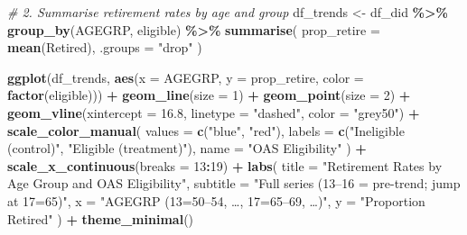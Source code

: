 \documentclass[
]{article}
\newenvironment{Shaded}{\begin{snugshade}}{\end{snugshade}}
\newcommand{\AttributeTok}[1]{\textcolor[rgb]{0.13,0.29,0.53}{#1}}
\newcommand{\CommentTok}[1]{\textcolor[rgb]{0.56,0.35,0.01}{\textit{#1}}}
\newcommand{\DecValTok}[1]{\textcolor[rgb]{0.00,0.00,0.81}{#1}}
\newcommand{\FloatTok}[1]{\textcolor[rgb]{0.00,0.00,0.81}{#1}}
\newcommand{\FunctionTok}[1]{\textcolor[rgb]{0.13,0.29,0.53}{\textbf{#1}}}
\newcommand{\NormalTok}[1]{#1}
\newcommand{\OtherTok}[1]{\textcolor[rgb]{0.56,0.35,0.01}{#1}}
\newcommand{\SpecialCharTok}[1]{\textcolor[rgb]{0.81,0.36,0.00}{\textbf{#1}}}
\newcommand{\StringTok}[1]{\textcolor[rgb]{0.31,0.60,0.02}{#1}}
\begin{document}
\begin{Shaded}
\begin{Highlighting}[]
\CommentTok{\# 2. Summarise retirement rates by age and group}
\NormalTok{df\_trends }\OtherTok{\textless{}{-}}\NormalTok{ df\_did }\SpecialCharTok{\%\textgreater{}\%}
  \FunctionTok{group\_by}\NormalTok{(AGEGRP, eligible) }\SpecialCharTok{\%\textgreater{}\%}
  \FunctionTok{summarise}\NormalTok{(}
    \AttributeTok{prop\_retire =} \FunctionTok{mean}\NormalTok{(Retired),}
    \AttributeTok{.groups =} \StringTok{"drop"}
\NormalTok{  )}
\end{Highlighting}
\end{Shaded}

\begin{Shaded}
\begin{Highlighting}[]
\FunctionTok{ggplot}\NormalTok{(df\_trends, }\FunctionTok{aes}\NormalTok{(}\AttributeTok{x =}\NormalTok{ AGEGRP, }\AttributeTok{y =}\NormalTok{ prop\_retire, }\AttributeTok{color =} \FunctionTok{factor}\NormalTok{(eligible))) }\SpecialCharTok{+}
  \FunctionTok{geom\_line}\NormalTok{(}\AttributeTok{size =} \DecValTok{1}\NormalTok{) }\SpecialCharTok{+}
  \FunctionTok{geom\_point}\NormalTok{(}\AttributeTok{size =} \DecValTok{2}\NormalTok{) }\SpecialCharTok{+}
  \FunctionTok{geom\_vline}\NormalTok{(}\AttributeTok{xintercept =} \FloatTok{16.8}\NormalTok{, }\AttributeTok{linetype =} \StringTok{"dashed"}\NormalTok{, }\AttributeTok{color =} \StringTok{"grey50"}\NormalTok{) }\SpecialCharTok{+}
  \FunctionTok{scale\_color\_manual}\NormalTok{(}
    \AttributeTok{values =} \FunctionTok{c}\NormalTok{(}\StringTok{"blue"}\NormalTok{, }\StringTok{"red"}\NormalTok{),}
    \AttributeTok{labels =} \FunctionTok{c}\NormalTok{(}\StringTok{"Ineligible (control)"}\NormalTok{, }\StringTok{"Eligible (treatment)"}\NormalTok{),}
    \AttributeTok{name   =} \StringTok{"OAS Eligibility"}
\NormalTok{  ) }\SpecialCharTok{+}
  \FunctionTok{scale\_x\_continuous}\NormalTok{(}\AttributeTok{breaks =} \DecValTok{13}\SpecialCharTok{:}\DecValTok{19}\NormalTok{) }\SpecialCharTok{+}
  \FunctionTok{labs}\NormalTok{(}
    \AttributeTok{title    =} \StringTok{"Retirement Rates by Age Group and OAS Eligibility"}\NormalTok{,}
    \AttributeTok{subtitle =} \StringTok{"Full series (13–16 = pre{-}trend; jump at 17=65)"}\NormalTok{,}
    \AttributeTok{x        =} \StringTok{"AGEGRP (13=50–54, …, 17=65–69, …)"}\NormalTok{,}
    \AttributeTok{y        =} \StringTok{"Proportion Retired"}
\NormalTok{  ) }\SpecialCharTok{+}
  \FunctionTok{theme\_minimal}\NormalTok{()}
\end{Highlighting}
\end{Shaded}
\end{document}
